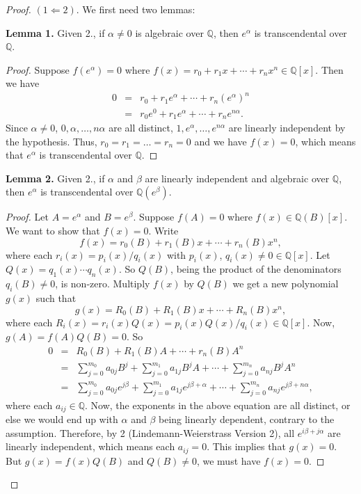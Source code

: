 \documentclass[12pt]{article}
\newcommand{\rats}{\mathbb{Q}}
\begin{document}
\begin{proof}
$(1 \Longleftarrow 2).$  We first need two lemmas:

\textbf{Lemma 1.}  Given 2., if $\alpha\neq 0$ is algebraic over $\rats$, then $e^{\alpha}$ is transcendental
over $\rats$.
\begin{proof}
Suppose $f(e^\alpha)=0$ where $f(x)=r_0+r_1x+\cdots+r_nx^n\in\rats[x]$.  Then we have
\begin{eqnarray*}
0 &=& r_0+r_1e^{\alpha}+\cdots+r_n(e^{\alpha})^n \\
&=& r_0e^0+r_1e^{\alpha}+\cdots+r_ne^{n\alpha}.
\end{eqnarray*}
Since $\alpha\neq0$, $0,\alpha,\ldots,n\alpha$ are all distinct, $1, e^{\alpha},\ldots,e^{n\alpha}$ are
linearly independent by the hypothesis.  Thus, $r_0=r_1=\ldots=r_n=0$ and we have $f(x)=0$, which means that
$e^{\alpha}$ is transcendental over $\rats$.
\end{proof}

\textbf{Lemma 2.}  Given 2., if $\alpha$ and $\beta$ are linearly independent and algebraic over $\rats$, then
$e^{\alpha}$ is transcendental over $\rats(e^{\beta})$.
\begin{proof}
Let $A=e^{\alpha}$ and $B=e^{\beta}$.  Suppose $f(A)=0$ where $f(x)\in\rats(B)[x]$.  We want to show that $f(x)=0$.
Write $$f(x)=r_0(B)+r_1(B)x+\cdots+r_n(B)x^n,$$ where each $r_i(x)=p_i(x)/q_i(x)$ with $p_i(x)$, $q_i(x)\neq 0 \in
\rats[x]$. Let $Q(x)=q_1(x)\cdots q_n(x)$.  So $Q(B)$, being the product of the denominators $q_i(B)\neq 0$, is non-zero.
Multiply $f(x)$ by $Q(B)$ we get a new polynomial $g(x)$ such that  $$g(x)=R_0(B)+R_1(B)x+\cdots+R_n(B)x^n,$$
where each $R_i(x)=r_i(x)Q(x)=p_i(x)Q(x)/q_i(x)\in \rats[x]$.  Now, $g(A)=f(A)Q(B)=0$.  So
\begin{eqnarray*}
0 &=& R_0(B)+R_1(B)A+\cdots+r_n(B)A^n \\
&=& \sum_{j=0}^{m_0}a_{0j}B^j+\sum_{j=0}^{m_1}a_{1j}B^jA+\cdots+\sum_{j=0}^{m_n}a_{nj}B^jA^n \\
&=& \sum_{j=0}^{m_0}a_{0j}e^{j\beta}+\sum_{j=0}^{m_1}a_{1j}e^{j\beta+\alpha}+\cdots+
\sum_{j=0}^{m_n}a_{nj}e^{j\beta+n\alpha},
\end{eqnarray*}
where each $a_{ij}\in \rats$.  Now, the exponents in the above equation are all distinct, or else we would end up with
$\alpha$ and $\beta$ being linearly dependent, contrary to the assumption.  Therefore, by 2 (Lindemann-Weierstrass
Version 2), all $e^{i\beta+j\alpha}$ are linearly independent, which means each $a_{ij}=0$.  This implies that $g(x)=0$.
But $g(x)=f(x)Q(B)$ and $Q(B)\neq 0$, we must have $f(x)=0$.
\end{proof}


\end{proof}
\end{document}
